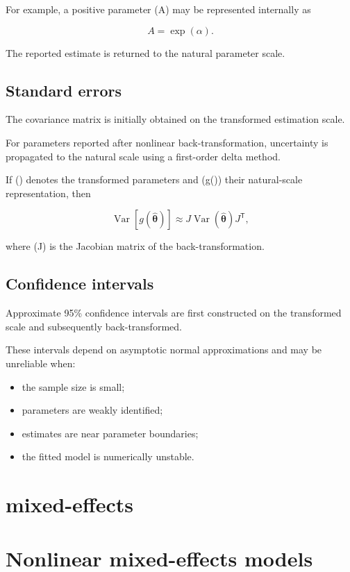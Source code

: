 \documentclass[
  english,
  letterpaper,
  DIV=11,
  numbers=noendperiod]{scrreprt}
\providecommand{\tightlist}{%
  \setlength{\itemsep}{0pt}\setlength{\parskip}{0pt}}
\begin{document}
For example, a positive parameter (A) may be represented internally as

\[
A = \exp(\alpha).
\]

The reported estimate is returned to the natural parameter scale.

\section{Standard errors}\label{standard-errors}

The covariance matrix is initially obtained on the transformed
estimation scale.

For parameters reported after nonlinear back-transformation, uncertainty
is propagated to the natural scale using a first-order delta method.

If (\boldsymbol\theta) denotes the transformed parameters and
(g(\boldsymbol\theta)) their natural-scale representation, then

\[
\operatorname{Var}\!\left[g(\hat{\boldsymbol\theta})\right]
\approx
J
\operatorname{Var}(\hat{\boldsymbol\theta})
J^\mathsf{T},
\]

where (J) is the Jacobian matrix of the back-transformation.

\section{Confidence intervals}\label{confidence-intervals}

Approximate 95\% confidence intervals are first constructed on the
transformed scale and subsequently back-transformed.

These intervals depend on asymptotic normal approximations and may be
unreliable when:

\begin{itemize}
\tightlist
\item
  the sample size is small;
\item
  parameters are weakly identified;
\item
  estimates are near parameter boundaries;
\item
  the fitted model is numerically unstable.
\end{itemize}

\chapter{mixed-effects}\label{mixed-effects}

\chapter{Nonlinear mixed-effects
models}\label{nonlinear-mixed-effects-models}
\end{document}

